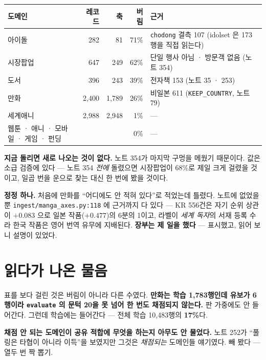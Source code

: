 \documentclass[11pt]{article}
\begin{document}
\begin{center}
\begin{tabular}{lrrrl}
\hline
도메인 & 레코드 & 축 & 버림 & 근거 \\
\hline
아이돌   &   282 &    81 & 71\% & \texttt{chodong} 결측 107 (idolset 은 173행을 직접 읽는다) \\
시장팝업 &   647 &   249 & 62\% & 단일 행사 아님 · 방문객 없음 (노트 354) \\
도서     &   396 &   243 & 39\% & 전자책 153 (노트 35 · 253) \\
만화     & 2,400 & 1,789 & 26\% & 비일본 611 (\texttt{KEEP\_COUNTRY}, 노트 79) \\
세계애니 & 2,988 & 2,948 &  1\% & --- \\
웹툰 · 애니 · 모바일 · 게임 · 펀딩 & & & 0\% & --- \\
\hline
\end{tabular}
\end{center}

\textbf{지금 돌리면 새로 나오는 것이 없다.} 노트 354가 마지막 구멍을
메웠기 때문이다. 값은 소급 검증에 있다 --- 노트 354 \emph{전에} 돌렸으면
시장팝업이 68\%로 제일 크게 걸렸을 것이고, 일곱 번을 운으로 찾는 대신
한 번에 봤을 것이다.

\textbf{정정 하나.} 처음에 만화를 ``어디에도 안 적혀 있다''로 적었는데
틀렸다. 노트에 없었을 뿐 \texttt{ingest/manga\_axes.py:118} 에 근거까지 다
있다 --- KR 556건은 자기 순위 상관이 $+0.083$ 으로 일본 작품($+0.477$)의
6분의 1이고, 라벨이 \emph{세계 독자}의 서재 등록 수라 한국 작품은 영어
번역 유무에 지배된다. \textbf{장부는 제 일을 했다} --- 표시했고, 읽어 보니
설명이 있었다.

\section{읽다가 나온 물음}

표를 보다 걸린 것은 버림이 아니라 다른 수였다. \textbf{만화는 학습
1,783행인데 유보가 6행이라 \texttt{evaluate} 의 문턱 20을 못 넘어 한 번도
채점되지 않는다.} 판 가중에도 안 들어간다. 그런데 학습에는 들어간다 ---
전체 학습 10,483행의 \textbf{17\%}다.

\textbf{채점 안 되는 도메인이 공유 적합에 무엇을 하는지 아무도 안 물었다.}
노트 252가 ``풀링은 타협이 아니라 이득''을 보였지만 그것은 \emph{채점되는}
도메인들 얘기였다. 빼 봤다 --- 열두 번 짝 뽑기.
\end{document}
